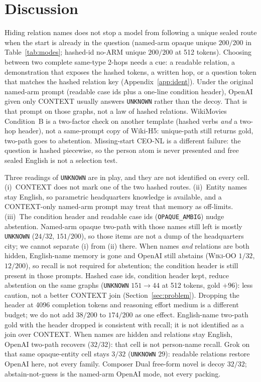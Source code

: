 \documentclass[10pt]{article} %
\begin{document}
\section{Discussion}

Hiding relation names does not stop a model from following a unique
sealed route when the start is already in the question
(named-arm opaque unique $200/200$ in Table~\ref{tab:modes};
hashed-id no-ARM unique $200/200$ at 512 tokens).
Choosing between two complete same-type 2-hops needs a cue: a readable
relation, a demonstration that exposes the hashed tokens, a written hop,
or a question token that matches the hashed relation key
(Appendix~\ref{app:ident}).
Under the original named-arm prompt (readable case ids plus a one-line
condition header), OpenAI given only CONTEXT usually answers
\texttt{UNKNOWN} rather than the decoy.
That is that prompt on those graphs, not a law of hashed relations.
WikiMovies Condition~B is a two-factor check on another template (hashed
verbs \emph{and} a two-hop header), not a same-prompt copy of Wiki-H5:
unique-path still returns gold, two-path goes to abstention.
Missing-start CEO-NL is a different failure: the question is hashed
piecewise, so the person atom is never presented and free sealed English
is not a selection test.

Three readings of \texttt{UNKNOWN} are in play, and they are not identified
on every cell.
(i)~CONTEXT does not mark one of the two hashed routes.
(ii)~Entity names stay English, so parametric headquarters knowledge is
available, and a CONTEXT-only named-arm prompt may treat that memory as
off-limits.
(iii)~The condition header and readable case ids (\texttt{OPAQUE\_AMBIG})
nudge abstention.
Named-arm opaque two-path with those names still left is mostly
\texttt{UNKNOWN} ($24/32$, $151/200$), so those items are not a dump of
the headquarters city; we cannot separate (i) from (ii) there.
When names \emph{and} relations are both hidden, English-name memory is
gone and OpenAI still abstains (\textsc{Wiki-OO} $1/32$, $12/200$),
so recall is not required for abstention; the condition header is still
present in those prompts.
Hashed case ids, condition header kept, reduce abstention on the same
graphs (\texttt{UNKNOWN} $151\to 44$ at 512 tokens, gold ${+}96$): less
caution, not a better CONTEXT join (Section~\ref{sec:problem}).
Dropping the header at 4096 completion tokens and reasoning effort medium
is a different budget; we do not add $38/200$ to $174/200$ as one effect.
English-name two-path gold with the header dropped is consistent with
recall; it is not identified as a join over CONTEXT.
When names are hidden and relations stay English, OpenAI two-path recovers
($32/32$): that cell is not person-name recall.
Grok on that same opaque-entity cell stays $3/32$ (\texttt{UNKNOWN} $29$):
readable relations restore OpenAI here, not every family.
Composer Dual free-form novel is decoy $32/32$; abstain-not-guess is the
named-arm OpenAI mode, not every packing.
\end{document}
